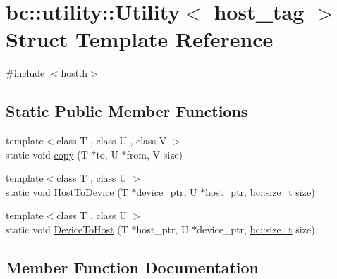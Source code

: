 \hypertarget{structbc_1_1utility_1_1Utility_3_01host__tag_01_4}{}\section{bc\+:\+:utility\+:\+:Utility$<$ host\+\_\+tag $>$ Struct Template Reference}
\label{structbc_1_1utility_1_1Utility_3_01host__tag_01_4}


{\ttfamily \#include $<$host.\+h$>$}

\subsection*{Static Public Member Functions}
\begin{DoxyCompactItemize}
\item 
{\footnotesize template$<$class T , class U , class V $>$ }\\static void \hyperlink{structbc_1_1utility_1_1Utility_3_01host__tag_01_4_a0a31097098468dddf26c267557a5fc35}{copy} (T $\ast$to, U $\ast$from, V size)
\item 
{\footnotesize template$<$class T , class U $>$ }\\static void \hyperlink{structbc_1_1utility_1_1Utility_3_01host__tag_01_4_a341dbdab86fd6dc455604f7a4f44b23d}{Host\+To\+Device} (T $\ast$device\+\_\+ptr, U $\ast$host\+\_\+ptr, \hyperlink{namespacebc_aaf8e3fbf99b04b1b57c4f80c6f55d3c5}{bc\+::size\+\_\+t} size)
\item 
{\footnotesize template$<$class T , class U $>$ }\\static void \hyperlink{structbc_1_1utility_1_1Utility_3_01host__tag_01_4_a36373909f09a03f833d26c5bebcea1c5}{Device\+To\+Host} (T $\ast$host\+\_\+ptr, U $\ast$device\+\_\+ptr, \hyperlink{namespacebc_aaf8e3fbf99b04b1b57c4f80c6f55d3c5}{bc\+::size\+\_\+t} size)
\end{DoxyCompactItemize}


\subsection{Member Function Documentation}
\mbox{\label{structbc_1_1utility_1_1Utility_3_01host__tag_01_4_a0a31097098468dddf26c267557a5fc35}} 
